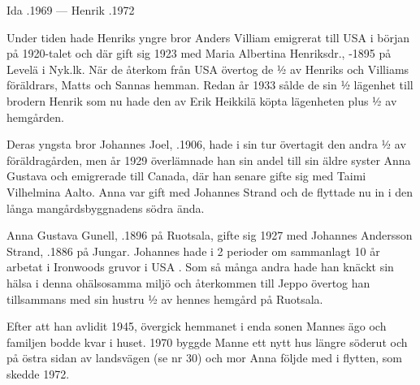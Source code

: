 Ida .1969  ---  Henrik .1972

Under tiden hade Henriks yngre bror Anders Villiam emigrerat till USA i början på 1920-talet och där gift sig 1923 med Maria Albertina Henriksdr., -1895 på Levelä i Nyk.lk. När de återkom från USA övertog de ½ av Henriks och Villiams föräldrars,  Matts och Sannas hemman. Redan år 1933 sålde de sin ½ lägenhet till brodern Henrik som nu hade den av Erik Heikkilä köpta lägenheten plus ½ av hemgården.

Deras yngsta bror Johannes Joel, .1906, hade i sin tur övertagit den andra ½  av föräldragården, men år 1929  överlämnade han sin andel till sin äldre syster Anna Gustava och emigrerade till Canada, där han senare gifte sig med Taimi Vilhelmina Aalto. Anna var gift med Johannes Strand och de flyttade nu in i den långa mangårdsbyggnadens södra ända.


Anna Gustava Gunell, .1896 på Ruotsala, gifte sig 1927 med Johannes Andersson Strand, .1886 på Jungar. Johannes hade i 2 perioder om sammanlagt 10 år arbetat i Ironwoods gruvor i USA . Som så många andra hade han knäckt sin hälsa i denna ohälsosamma miljö och återkommen till Jeppo övertog han tillsammans med sin hustru ½ av hennes hemgård på Ruotsala.

Efter att han avlidit 1945, övergick hemmanet i enda sonen Mannes ägo och familjen bodde kvar i huset. 1970 byggde Manne ett nytt hus längre söderut och på östra sidan av landsvägen (se nr 30) och mor Anna följde med i flytten, som skedde 1972.
\begin{jhchildren}
  \item {}
  \item {}
  \item {}
  \item {}
  \item {}
  \item {}
  \item {}
\end{jhchildren}

